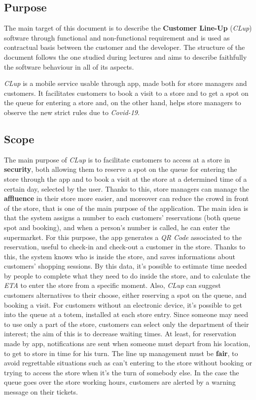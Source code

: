 \documentclass{article}
\begin{document}
	\subsection{Purpose}
	
	The main target of this document is to describe the {\bfseries Customer Line-Up} (\emph{CLup}) software through functional and non-functional requirement and is used as contractual basis between the customer and the developer. The structure of the document follows the one studied during lectures and aims to describe faithfully the software behaviour in all of its aspects.
	
	\emph{CLup} is a mobile service usable through app, made both for store managers and customers. It facilitates customers to book a visit to a store and to get a spot on the queue for entering a store and, on the other hand, helps store managers to observe the new strict rules due to \emph{Covid-19}.
	
	\subsection{Scope}
	
	The main purpose of \emph{CLup} is to facilitate customers to access at a store in {\bfseries security}, both allowing them to reserve a spot on the queue for entering the store through the app and to book a visit at the store at a determined time of a certain day, selected by the user. Thanks to this, store managers can manage the {\bfseries affluence} in their store more easier, and moreover can reduce the crowd in front of the store, that is one of the main purpose of the application. The main idea is that the system assigns a number to each customers' reservations (both queue spot and booking), and when a person's number is called, he can enter the supermarket. For this purpose, the app generates a \emph{QR Code} associated to the reservation, useful to check-in and check-out a customer in the store. Thanks to this, the system knows who is inside the store, and saves informations about customers' shopping sessions. By this data, it's possible to estimate time needed by people to complete what they need to do inside the store, and to calculate the \emph{ETA} to enter the store from a specific moment. Also, \emph{CLup} can suggest customers alternatives to their choose, either reserving a spot on the queue, and booking a visit. For customers without an electronic device, it's possible to get into the queue at a totem, installed at each store entry. Since someone may need to use only a part of the store, customers can select only the department of their interest; the aim of this is to decrease waiting times. At least, for reservation made by app, notifications are sent when someone must depart from his location, to get to store in time for his turn. The line up management must be {\bfseries fair}, to avoid regrettable situations such as can't entering to the store without booking or trying to access the store when it's the turn of somebody else. In the case the queue goes over the store working hours, customers are alerted by a warning message on their tickets.
\end{document}

